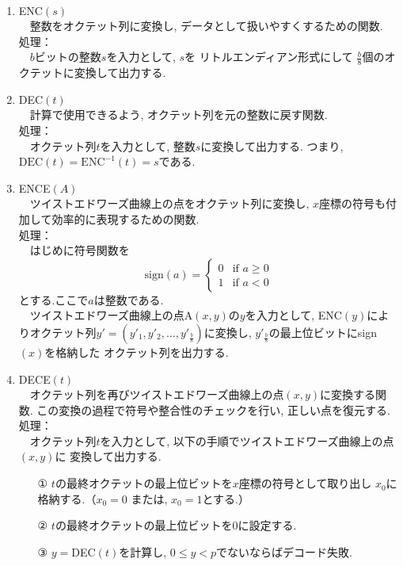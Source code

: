 \\
\begin{enumerate}
  \item ENC$(s)$\\
  　整数をオクテット列に変換し, データとして扱いやすくするための関数.\\
  処理：\\
  　$b$ビットの整数$s$を入力として, $s$を リトルエンディアン形式にして
  $\tfrac{b}{8}$個のオクテットに変換して出力する.
  \item DEC$(t)$\\
  　計算で使用できるよう, オクテット列を元の整数に戻す関数.\\
  処理：\\
  　オクテット列$t$を入力として, 整数$s$に変換して出力する.
  つまり, $\mathrm{DEC}(t)=\mathrm{ENC}^{-1}(t)=s$である.
  \item ENCE$(A)$\\
  　ツイストエドワーズ曲線上の点をオクテット列に変換し, 
  $x$座標の符号も付加して効率的に表現するための関数.\\
  処理：\\
  　はじめに符号関数を
  \[
    \text{sign}(a) =
    \begin{cases}
    0 & \text{if } a \geq 0 \\
    1 & \text{if } a < 0
    \end{cases}
  \]
  とする.ここで$a$は整数である.\\
  　ツイストエドワーズ曲線上の点A$(x,y)$の$y$を入力として, 
  ENC$(y)$によりオクテット列$y'=(y'_1,y'_2,...,y'_\frac{b}{8})$に変換し, 
  $y'_\frac{b}{8}$の最上位ビットにsign$(x)$を格納した
  オクテット列を出力する.
  \item DECE$(t)$\\
  　オクテット列を再びツイストエドワーズ曲線上の点$(x, y)$に変換する関数.
  この変換の過程で符号や整合性のチェックを行い, 正しい点を復元する.\\
  処理：\\
  　オクテット列$t$を入力として, 以下の手順でツイストエドワーズ曲線上の点$(x,y)$に
  変換して出力する.
  \begin{enumerate}
    \item[①　] $t$の最終オクテットの最上位ビットを$x$座標の符号として取り出し
    $x_0$に格納する.（$x_0=0$ または, $x_0=1$とする.）
    \item[②　] $t$の最終オクテットの最上位ビットを0に設定する.
    \item[③　] $y=$DEC$(t)$を計算し, $0\leq y<p$でないならばデコード失敗.

\end{enumerate}
\end{enumerate}
